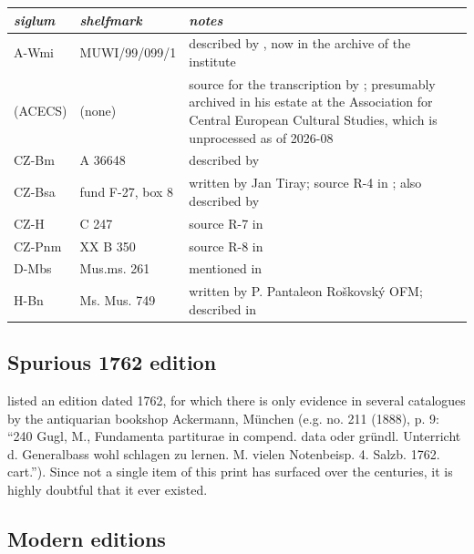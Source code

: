 \documentclass[abbrwidth=7em,shorttitlesize=55]{ees}
\begin{document}
\begin{tabularx}{\textwidth}{llX}
  \toprule
  \itshape siglum & \itshape shelfmark & \itshape notes \\
  \midrule
  A-Wmi & MUWI/99/099/1 & described by \textcite[p. 163f]{Wessely1957}, now in the archive of the institute \\
  (ACECS) & (none) & source for the transcription by \textcite{Pulkert2014}; presumably archived in his estate at the Association for Central European Cultural Studies, which is unprocessed as of 2026-08 \\
  CZ-Bm & A 36648 & described by \textcite{Prendl2015} \\
  CZ-Bsa & fund F-27, box 8 & written by Jan Tiray; source R-4 in \textcite[90]{Ludvova1985}; also described by \textcite[31]{Sehnal1982} \\
  CZ-H & C 247 & source R-7 in \textcite[92]{Ludvova1985} \\
  CZ-Pnm & XX B 350 & source R-8 in \textcite[p. 92f]{Ludvova1985} \\
  D-Mbs & Mus.ms. 261 & mentioned in \textcite{Prendl2015} \\
  H-Bn & Ms. Mus. 749 & written by P. Pantaleon Roškovský OFM; described in \textcite{Kacic2018} \\
  \bottomrule
\end{tabularx}


\subsection{Spurious 1762 edition}

\textcite[p. 62, no. 6]{Wessely1957} listed an edition dated 1762, for which there is only evidence in several catalogues by the antiquarian bookshop Ackermann, München (e.g. no. 211 (1888), p. 9: “240 Gugl, M., Fundamenta partiturae in compend. data oder gründl. Unterricht d. Generalbass wohl schlagen zu lernen. M. vielen Notenbeisp. 4. Salzb. 1762. cart.”). Since not a single item of this print has surfaced over the centuries, it is highly doubtful that it ever existed.


\subsection{Modern editions}
\end{document}
